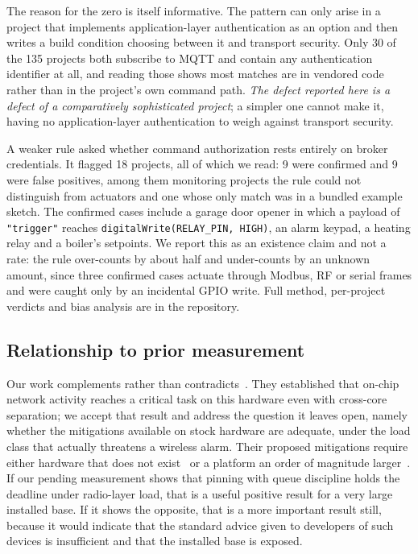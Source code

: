 The reason for the zero is itself informative. The pattern can only arise in a project that
implements application-layer authentication as an option and then writes a build condition
choosing between it and transport security. Only 30 of the 135 projects both subscribe to MQTT
and contain any authentication identifier at all, and reading those shows most matches are in
vendored code rather than in the project's own command path. \emph{The defect reported here is
a defect of a comparatively sophisticated project}; a simpler one cannot make it, having no
application-layer authentication to weigh against transport security.

A weaker rule asked whether command authorization rests entirely on broker credentials. It
flagged 18 projects, all of which we read: 9 were confirmed and 9 were false positives, among
them monitoring projects the rule could not distinguish from actuators and one whose only match
was in a bundled example sketch. The confirmed cases include a garage door opener in which a
payload of \texttt{"trigger"} reaches \texttt{digitalWrite(RELAY\_PIN, HIGH)}, an alarm keypad,
a heating relay and a boiler's setpoints. We report this as an existence claim and not a rate:
the rule over-counts by about half and under-counts by an unknown amount, since three confirmed
cases actuate through Modbus, RF or serial frames and were caught only by an incidental GPIO
write. Full method, per-project verdicts and bias analysis are in the repository.

\subsection{Relationship to prior measurement}

Our work complements rather than contradicts~\cite{behnke2020}. They established that on-chip
network activity reaches a critical task on this hardware even with cross-core separation; we
accept that result and address the question it leaves open, namely whether the mitigations
available on stock hardware are adequate, under the load class that actually threatens a wireless
alarm. Their proposed mitigations require either hardware that does not
exist~\cite{behnke2022} or a platform an order of magnitude larger~\cite{behnke2023}. If our
pending measurement shows that pinning with queue discipline holds the deadline under radio-layer
load, that is a useful positive result for a very large installed base. If it shows the opposite,
that is a more important result still, because it would indicate that the standard advice given
to developers of such devices is insufficient and that the installed base is exposed.

